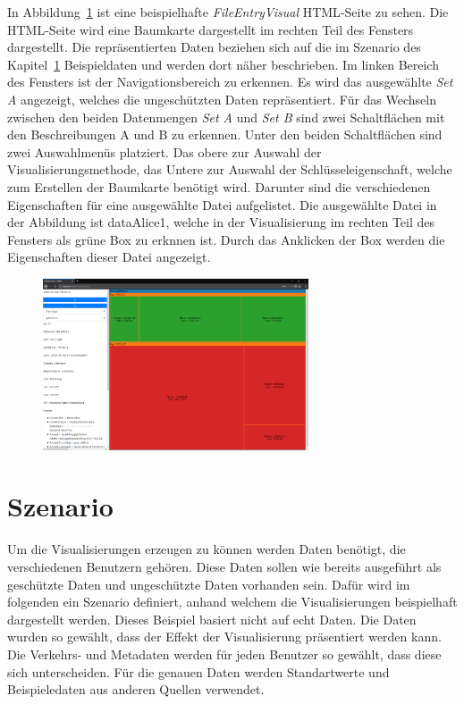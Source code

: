 \documentclass[
    fontsize=12pt,
    headings=small,
    parskip=half,           %
    bibliography=totoc,
    numbers=noenddot,       %
    open=any,               %
    ]{scrreprt}
\begin{document}
In Abbildung~\ref{fig:VisualPageAll} ist eine beispielhafte \textit{FileEntryVisual} \ac{HTML}-Seite zu sehen.
Die \ac{HTML}-Seite wird eine Baumkarte dargestellt im rechten Teil des Fensters dargestellt.
Die repräsentierten Daten beziehen sich auf die im Szenario des Kapitel~\ref{Kap:Szenarios} Beispieldaten und werden dort näher beschrieben.
Im linken Bereich des Fensters ist der Navigationsbereich zu erkennen.
Es wird das ausgewählte \textit{Set A} angezeigt, welches die ungeschützten Daten repräsentiert.
Für das Wechseln zwischen den beiden Datenmengen \textit{Set A} und \textit{Set B} sind zwei Schaltflächen mit den Beschreibungen A und B zu erkennen.
Unter den beiden Schaltflächen sind zwei Auswahlmenüs platziert. 
Das obere zur Auswahl der Visualisierungsmethode, das Untere zur Auswahl der Schlüsseleigenschaft, welche zum Erstellen der Baumkarte benötigt wird.
Darunter sind die verschiedenen Eigenschaften für eine ausgewählte Datei aufgelistet.
Die ausgewählte Datei in der Abbildung ist dataAlice1, welche in der Visualisierung im rechten Teil des Fensters als grüne Box zu erknnen ist.
Durch das Anklicken der Box werden die Eigenschaften dieser Datei angezeigt.
\begin{figure}[H]
\includegraphics[width=0.7\textwidth]{../pic/VisualPageAll.png}
\label{fig:VisualPageAll}
\end{figure}

\chapter{Szenario} \label{Kap:Szenarios}

Um die Visualisierungen erzeugen zu können werden Daten benötigt, die verschiedenen Benutzern gehören.
Diese Daten sollen wie bereits ausgeführt als geschützte Daten und ungeschützte Daten vorhanden sein. 
Dafür wird im folgenden ein Szenario definiert, anhand welchem die Visualisierungen beispielhaft dargestellt werden. 
Dieses Beispiel basiert nicht auf echt Daten.
Die Daten wurden so gewählt, dass der Effekt der Visualisierung präsentiert werden kann.
Die Verkehrs- und Metadaten werden für jeden Benutzer so gewählt, dass diese sich unterscheiden. 
Für die genauen Daten werden Standartwerte und Beispieledaten aus anderen Quellen verwendet. 
\end{document}
